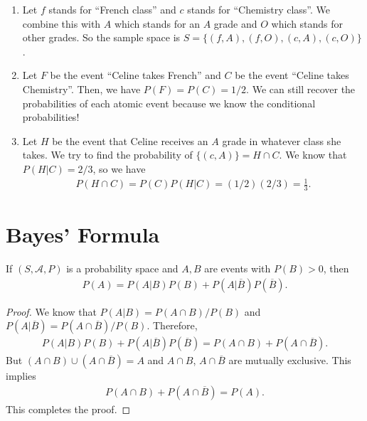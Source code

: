 \begin{sol*}
\begin{enumerate}[label=\Circled{\arabic*}]
\item Let $f$ stands for ``French class'' and $c$ stands for ``Chemistry class''. We combine this with $A$ which stands for an $A$ grade and $O$ which stands for other grades. So the sample space is $S = \{ (f, A ) , (f, O ) , (c, A) , (c, O ) \}$. 
\item Let $F$ be the event ``Celine takes French'' and $C$ be the event ``Celine takes Chemistry''. Then, we have $P (F) = P (C) = 1/2$. We can still recover the probabilities of each atomic event because we know the conditional probabilities!
\item Let $H$ be the event that Celine receives an $A$ grade in whatever class she takes. We try to find the probability of $\{ (c, A ) \} = H \cap C$. We know that $P (H | C ) = 2/3$, so we have
	\begin{align*}
	P (H \cap C) = P (C) P (H | C) = (1/2) (2/3) = \frac{1}{3} . \tag*{$\triangle$}
	\end{align*}
\end{enumerate}
\end{sol*}

\section{Bayes' Formula}

\begin{theorem}
If $(S, \mathcal{A} , P )$ is a probability space and $A, B$ are events with $P (B) > 0$, then
	\begin{align}
	P (A) = P (A|B) P (B) + P (A|\overline{B}) P (\overline{B}) . \label{Eq:BayesFormula}
	\end{align}
\end{theorem}
\begin{proof}
We know that $P (A | B) = P (A \cap B) / P (B)$ and $P (A | \overline{B}) = P (A \cap \overline{B}) / P (B)$. Therefore,
	\begin{align*}
	P (A | B) P (B) + P (A | \overline{B}) P (\overline{B}) = P (A \cap B) + P (A \cap \overline{B}) .
	\end{align*}
But $(A \cap B) \cup (A \cap \overline{B}) = A$ and $A \cap B$, $A \cap \overline{B}$ are mutually exclusive. This implies
	\begin{align*}
	P (A \cap B) + P (A \cap \overline{B}) = P (A) .
	\end{align*}
This completes the proof.
\end{proof}

